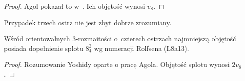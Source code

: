 \begin{proof}
    Agol pokazał to w~\cite{agol10}.
    Ich objętość wynosi $v_8$.
\end{proof}

Przypadek trzech ostrz nie jest zbyt dobrze zrozumiany.

\begin{proposition}
    Wśród orientowalnych 3-rozmaitości o~czterech ostrzach najmniejszą objętość posiada dopełnienie splotu $8_4^2$ wg numeracji Rolfsena (L8a13).
\end{proposition}

\begin{proof}
    Rozumowanie Yoshidy \cite{yoshida13} oparte o pracę Agola.
    Objętość splotu wynosi $2v_8$.
\end{proof}



